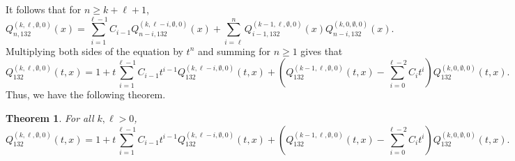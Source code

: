 \documentclass[
final,nomarks
]{dmtcs-episciences}
\newtheorem{theorem}{Theorem}
\newcommand{\Qmm}[1]{Q_{132}^{(#1)}(t,x)}
\newcommand{\Qmmn}[2]{Q_{#2,132}^{(#1)}(x)}
\begin{document}
It follows that for \begin{math}n \geq k+ \ell +1\end{math}, 
\begin{equation}
\Qmmn{k,\ell,\emptyset,0}{n}=\sum_{i=1}^{\ell-1}C_{i-1}\Qmmn{k,\ell-i,\emptyset,0}{n-i}+\sum_{i=\ell}^{n}\Qmmn{k-1,\ell,\emptyset,0}{i-1}\Qmmn{k,0,\emptyset,0}{n-i}.
\end{equation}
Multiplying both sides of the equation by \begin{math}t^n\end{math} and summing for \begin{math}n\geq 1\end{math} gives that
\begin{equation}
\Qmm{k,\ell,\emptyset,0}=1+t\sum_{i=1}^{\ell-1}C_{i-1}t^{i-1}\Qmm{k,\ell-i,\emptyset,0}+(\Qmm{k-1,\ell,\emptyset,0}-\sum_{i=0}^{\ell-2}C_it^i)\Qmm{k,0,\emptyset,0}.
\end{equation}
Thus, we have the following theorem.
\begin{theorem}\label{theorem:7}
	For all \begin{math}k,\ell>0\end{math},
	\begin{equation}
	\Qmm{k,\ell,\emptyset,0}=1+t\sum_{i=1}^{\ell-1}C_{i-1}t^{i-1}\Qmm{k,\ell-i,\emptyset,0}+(\Qmm{k-1,\ell,\emptyset,0}-\sum_{i=0}^{\ell-2}C_it^i)\Qmm{k,0,\emptyset,0}.
	\end{equation}	
\end{theorem}
\end{document}
